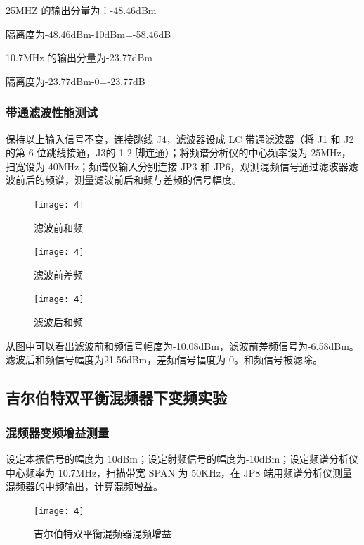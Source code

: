 \documentclass{../source/Experiment}
\begin{document}
        25MHZ 的输出分量为：-48.46dBm

        隔离度为-48.46dBm-10dBm=-58.46dB

        10.7MHz 的输出分量为-23.77dBm

        隔离度为-23.77dBm-0=-23.77dB
        
        \subsubsection{带通滤波性能测试}

        保持以上输入信号不变，连接跳线 J4，滤波器设成 LC 带通滤波器（将 J1 和 J2 的第 6 位跳线接通，J3的 1-2 脚连通）；将频谱分析仪的中心频率设为 25MHz，扫宽设为 40MHz；频谱仪输入分别连接 JP3 和 JP6，观测混频信号通过滤波器滤波前后的频谱，测量滤波前后和频与差频的信号幅度。

        \begin{figure}[H]
            \centering
            \texttt{[image: 4]}
            \caption{滤波前和频}
        \end{figure}

        \begin{figure}[H]
            \centering
            \texttt{[image: 4]}
            \caption{滤波前差频}
        \end{figure}

        \begin{figure}[H]
            \centering
            \texttt{[image: 4]}
            \caption{滤波后和频}
        \end{figure}

        从图中可以看出滤波前和频信号幅度为-10.08dBm，滤波前差频信号为-6.58dBm。滤波后和频信号幅度为21.56dBm，差频信号幅度为 0。和频信号被滤除。

    \subsection{吉尔伯特双平衡混频器下变频实验}
        \subsubsection{混频器变频增益测量}
        设定本振信号的幅度为 10dBm；设定射频信号的幅度为-10dBm；设定频谱分析仪中心频率为 10.7MHz，扫描带宽 SPAN 为 50KHz，在 JP8 端用频谱分析仪测量混频器的中频输出，计算混频增益。

        \begin{figure}[H]
            \centering
            \texttt{[image: 4]}
            \caption{吉尔伯特双平衡混频器混频增益}
        \end{figure}
\end{document}
